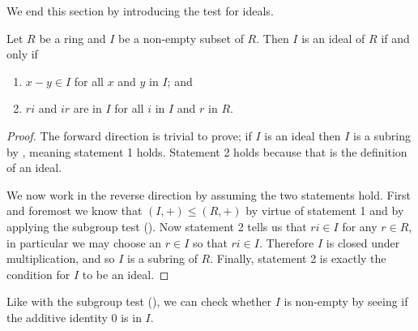\newpage

We end this section by introducing the test for ideals.
\begin{theorem}\label{thrm-test-for-ideal}
    Let $R$ be a ring and $I$ be a non-empty subset of $R$. Then $I$ is an ideal of $R$ if and only if
    \begin{enumerate}
        \item $x - y \in I$ for all $x$ and $y$ in $I$; and
        \item $ri$ and $ir$ are in $I$ for all $i$ in $I$ and $r$ in $R$.
    \end{enumerate}
\end{theorem}
\begin{proof}
    The forward direction is trivial to prove; if $I$ is an ideal then $I$ is a subring by , meaning statement 1 holds. Statement 2 holds because that is the definition of an ideal.

    We now work in the reverse direction by assuming the two statements hold. First and foremost we know that $(I,+) \leq (R,+)$ by virtue of statement 1 and by applying the subgroup test (). Now statement 2 tells us that $ri \in I$ for any $r \in R$, in particular we may choose an $r \in I$ so that $ri \in I$. Therefore $I$ is closed under multiplication, and so $I$ is a subring of $R$. Finally, statement 2 is exactly the condition for $I$ to be an ideal.
\end{proof}
\begin{remark}
    Like with the subgroup test (), we can check whether $I$ is non-empty by seeing if the additive identity 0 is in $I$.
\end{remark}

\newpage

